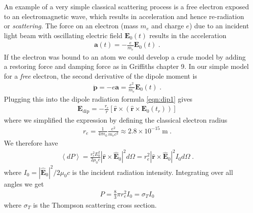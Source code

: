 \documentclass[12pt]{article}
\renewcommand{\vec}[1]{\boldsymbol{#1}}
\newcommand{\hvec}[1]{\hat{\vec{#1}}}
\newcommand{\avg}[1]{\left\langle #1 \right\rangle}
\begin{document}
An example of a very simple classical scattering process is a free electron exposed to an electromagnetic wave, which results in acceleration and hence re-radiation or \emph{scattering}.  %
The force on an electron (mass $m_e$ and charge $e$) due to an incident light beam with oscillating electric field $\vec{E}_0(t)$ 
results in the acceleration
\begin{align}
\vec{a}(t) =  -\frac{e}{m_e} \vec{E}_0(t) \;.
\end{align}
If the electron was bound to an atom we could develop a crude model by adding a restoring force and damping force as in Griffiths chapter 9.  In our simple model for a \emph{free} electron, the second derivative of the dipole moment is 
\begin{align}
\ddot{\vec{p}} =  -e \vec{a} = \frac{e^2}{m_e} \vec{E}_0(t) \;.
\end{align}  
Plugging this into the dipole radiation formula \ref{eqn:dip1} gives
\begin{align}
\vec{E}_\text{dip} =  -\frac{r_e}{r} [\hvec{r} \times ( \hvec{r} \times  \vec{E}_0(t_r))] 
\end{align}
where we simplified the expression by defining the classical electron radius%
\begin{align}
r_e = \frac{1}{4\pi \epsilon_0} \frac{e^2}{m_e c^2} \approx 2.8\times10^{-15} \; \text{m} \;.
\end{align}
We therefore have 
\begin{align}
\avg{dP}  = \frac{r_e^2 E_0^2}{ 2 \mu_0 c}  |\hvec{r}\times\hvec{E}_0|^2 d\Omega  = r_e^2  |\hvec{r}\times\hvec{E}_0|^2 I_0 d\Omega   \; .
\end{align}
where $I_0 = |\hvec{E}_0|^2/2\mu_0c$ is the incident radiation intensity.  Integrating over all angles we get
\begin{align}
P = \frac{8}{3}\pi r_e^2  I_0  = \sigma_T  I_0 
\end{align}
where $\sigma_T$ is the Thompson scattering cross section.
\end{document}
